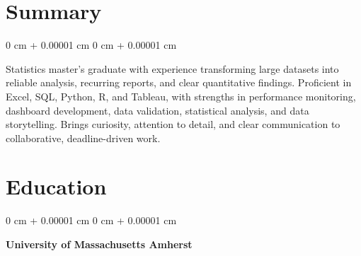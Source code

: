 \documentclass[10pt, letterpaper]{article}
\newenvironment{highlightsforbulletentries}{
    \begin{itemize}[
        topsep=0.10 cm,
        parsep=0.10 cm,
        partopsep=0pt,
        itemsep=0pt,
        leftmargin=10pt
    ]
}{
    \end{itemize}
} %
\newenvironment{onecolentry}{
    \begin{adjustwidth}{
        0 cm + 0.00001 cm
    }{
        0 cm + 0.00001 cm
    }
}{
    \end{adjustwidth}
} %
\begin{document}
    








    \section{Summary} 
        \begin{onecolentry}
         Statistics master's graduate with experience transforming large datasets into reliable analysis, recurring reports, and clear quantitative findings. Proficient in Excel, SQL, Python, R, and Tableau, with strengths in performance monitoring, dashboard development, data validation, statistical analysis, and data storytelling. Brings curiosity, attention to detail, and clear communication to collaborative, deadline-driven work.
        \end{onecolentry}
        
    \section{Education}

        \begin{onecolentry}
        \textbf{University of Massachusetts Amherst}
        \end{onecolentry}
        
\end{document}
